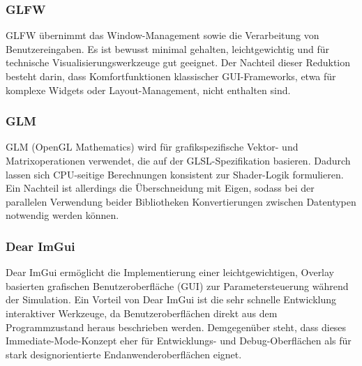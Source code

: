         \subsubsection{GLFW} 
        GLFW übernimmt das Window-Management sowie die Verarbeitung von Benutzereingaben.
        Es ist bewusst minimal gehalten, leichtgewichtig und für technische Visualisierungswerkzeuge gut geeignet.
        Der Nachteil dieser Reduktion besteht darin, dass Komfortfunktionen klassischer \ac{GUI}-Frameworks,
        etwa für komplexe Widgets oder Layout-Management, nicht enthalten sind.

        \subsubsection{GLM} 
        GLM (\ac{OpenGL} Mathematics) wird für grafikspezifische Vektor- und Matrixoperationen verwendet, die auf der GLSL-Spezifikation basieren.
        Dadurch lassen sich CPU-seitige Berechnungen konsistent zur Shader-Logik formulieren.
        Ein Nachteil ist allerdings die Überschneidung mit Eigen,
        sodass bei der parallelen Verwendung beider Bibliotheken Konvertierungen zwischen Datentypen notwendig werden können.

        \subsubsection{Dear ImGui} 
        Dear ImGui ermöglicht die Implementierung einer leichtgewichtigen,
        Overlay basierten grafischen Benutzeroberfläche (\ac{GUI}) zur Parametersteuerung während der Simulation.
        Ein Vorteil von Dear ImGui ist die sehr schnelle Entwicklung interaktiver Werkzeuge,
        da Benutzeroberflächen direkt aus dem Programmzustand heraus beschrieben werden.
        Demgegenüber steht, dass dieses Immediate-Mode-Konzept eher für Entwicklungs- und Debug-Oberflächen als für stark designorientierte Endanwenderoberflächen eignet.


